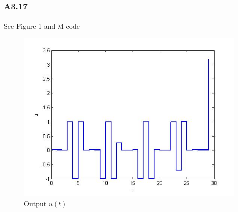 \subsubsection*{A3.17}
\paragraph{}
See Figure 1 and M-code
\begin{figure}
	\centering
	\includegraphics[scale=0.5]{fule}
	\caption{Output $u(t)$}
\end{figure}
